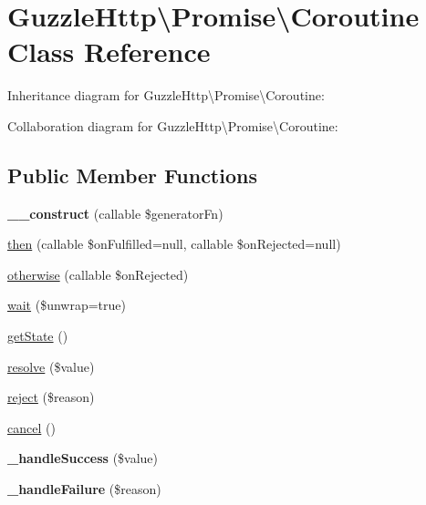 \hypertarget{classGuzzleHttp_1_1Promise_1_1Coroutine}{}\section{Guzzle\+Http\textbackslash{}Promise\textbackslash{}Coroutine Class Reference}
\label{classGuzzleHttp_1_1Promise_1_1Coroutine}


Inheritance diagram for Guzzle\+Http\textbackslash{}Promise\textbackslash{}Coroutine\+:


Collaboration diagram for Guzzle\+Http\textbackslash{}Promise\textbackslash{}Coroutine\+:
\subsection*{Public Member Functions}
\begin{DoxyCompactItemize}
\item 
\mbox{\label{classGuzzleHttp_1_1Promise_1_1Coroutine_ae310c78c9792ad2e8cfc6d70bf412784}} 
{\bfseries \+\_\+\+\_\+construct} (callable \$generator\+Fn)
\item 
\hyperlink{classGuzzleHttp_1_1Promise_1_1Coroutine_a11783468845f704928e1ba13a63534e8}{then} (callable \$on\+Fulfilled=null, callable \$on\+Rejected=null)
\item 
\hyperlink{classGuzzleHttp_1_1Promise_1_1Coroutine_adc412e8e82fa6fdee4649b8554452319}{otherwise} (callable \$on\+Rejected)
\item 
\hyperlink{classGuzzleHttp_1_1Promise_1_1Coroutine_ae227b3f676a5ef659ffba497e432cc1b}{wait} (\$unwrap=true)
\item 
\hyperlink{classGuzzleHttp_1_1Promise_1_1Coroutine_a67968b964dd78cde69e69267f2f6bc8e}{get\+State} ()
\item 
\hyperlink{classGuzzleHttp_1_1Promise_1_1Coroutine_a3af6486dd13c854b6598c7806addf87d}{resolve} (\$value)
\item 
\hyperlink{classGuzzleHttp_1_1Promise_1_1Coroutine_ad4894b8de07e0e279a475a309ca698e3}{reject} (\$reason)
\item 
\hyperlink{classGuzzleHttp_1_1Promise_1_1Coroutine_a7c999f58d48a3678a4e86b1796232649}{cancel} ()
\item 
\mbox{\label{classGuzzleHttp_1_1Promise_1_1Coroutine_aa748bed3010a8c825ec733b5d6693889}} 
{\bfseries \+\_\+handle\+Success} (\$value)
\item 
\mbox{\label{classGuzzleHttp_1_1Promise_1_1Coroutine_ac733251a73cba5f9fe281566692c0cf5}} 
{\bfseries \+\_\+handle\+Failure} (\$reason)
\end{DoxyCompactItemize}
